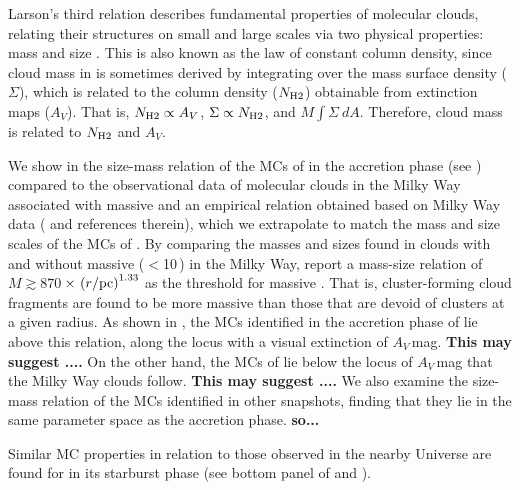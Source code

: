 \IfFileExists{emulateapjlegacy.cls}{\documentclass[iop]{emulateapjlegacy}}{\documentclass[iop]{emulateapj}}
\newcommand{\AP}[1]{({\bf \color{apcolor} AP: #1})}
\begin{document}
Larson's third relation describes fundamental properties of molecular clouds, relating their structures on small and large scales 
via two physical properties: mass and size \citep{Larson81a, Mckee07a}. This is also known as the law of constant column density, 
since cloud mass in \obs is sometimes derived by integrating
over the mass surface density ($\Sigma$), which is related to the column density ($N_{\rm H2}$) obtainable from extinction maps ($A_V$).   
That is, $N_{\rm H2}\propto A_V$, $\Sigma\propto N_{\rm H2}$, and $M$\eq$\int \Sigma~dA$.
Therefore, cloud mass is related to $N_{\rm H2}$ and $A_V$.

We show in  the size-mass relation of the MCs of \flower in the accretion phase (see )
compared to the 
observational data of molecular clouds in the Milky Way associated with massive \SF 
\citep{Beuther02a, Mueller02a, Hill05a, Motte07a} and an empirical relation obtained based on 
Milky Way data (\citealt{Kauffmann10b, Kauffmann10c} and references therein),
which we extrapolate to match the mass and size scales of the MCs of \flower.
By comparing the masses and sizes found in clouds with and without massive \SF ($<$10\,\Msun) 
in the Milky Way, \citet{Kauffmann10c} report a 
mass-size relation of $M \gtrsim 870$\,\Msun$\times\,\left(r/{\rm pc}\right)^{1.33}$ as the threshold for massive \SF. 
That is, cluster-forming cloud fragments are found to be more massive than those that are devoid of clusters 
at a given radius. As shown in , the MCs identified in the accretion phase of \flower lie above this relation, along the locus 
with a visual extinction of $A_V$\,mag. {\bf This may suggest ....}
On the other hand, the MCs of \flower lie below the locus of $A_V$\,mag that the Milky Way clouds follow.
{\bf This may suggest ....}
We also examine the size-mass relation of the MCs identified in other snapshots, finding that they lie in the same 
parameter space as the accretion phase. 
{\bf so...}

Similar MC properties in relation to those observed in the nearby Universe are found for \flower in its starburst phase (see bottom 
panel of  and ).
% 
\end{document}
